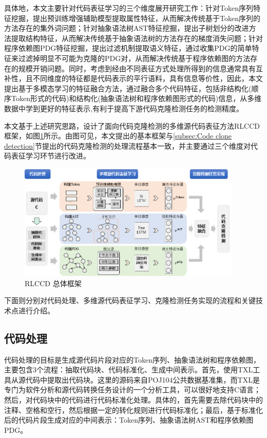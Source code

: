具体地，本文主要针对代码表征学习的三个维度展开研究工作：针对Token序列特征挖掘，提出预训练增强辅助模型提取属性特征，从而解决传统基于Token序列的方法存在的集外词问题；针对抽象语法树AST特征挖掘，提出子树划分的改进方法提取结构特征，从而解决传统基于抽象语法树的方法存在的梯度消失问题；针对程序依赖图PDG特征挖掘，提出过滤机制提取语义特征，通过收集PDG的简单特征来过滤掉明显不可能为克隆的PDG对，从而解决传统基于程序依赖图的方法存在的规模开销问题。同时，考虑到经由不同表征方式处理所得到的信息通常具有互补性，且不同维度的特征都是代码表示的平行语料，具有信息等价性，因此，本文提出基于多模态学习的特征融合方法，通过融合多个代码特征，包括非结构化(顺序Token形式的代码)和结构化(抽象语法树和程序依赖图形式的代码)信息，从多维数据中学到更好的特征表示,有利于提高下游代码克隆检测任务的检测精度。

本文基于上述研究思路，设计了面向代码克隆检测的多维源代码表征方法RLCCD框架，如图\ref{fig:framework}所示。由图可见，本文提出的基本框架与\ref{subsec:Code clone detection}节提出的代码克隆检测的处理流程基本一致，并主要通过三个维度对代码表征学习环节进行改进。

\begin{figure}
    \centering
    \includegraphics[width=0.95\textwidth]{figures/framework}
    \caption{RLCCD 总体框架}
    \label{fig:framework}
\end{figure}

下面则分别对代码处理、多维源代码表征学习、克隆检测任务实现的流程和关键技术点进行介绍。

\subsection{代码处理}
\label{subsec:Preprocess}
代码处理的目标是生成源代码片段对应的Token序列、抽象语法树和程序依赖图，主要包含3个流程：抽取代码块、代码标准化、生成中间表示。首先，使用TXL工具从源代码中提取出代码块。这里的源码来自POJ104公共数据基准集，而TXL是专门为软件分析和源代码转换任务设计的一个分析工具，可以很好地支持C语言；然后，对代码块中的代码进行代码标准化处理。具体的，首先需要去除代码块中的注释、空格和空行，然后根据一定的转化规则进行代码标准化；最后，基于标准化后的代码片段生成对应的中间表示：Token序列、抽象语法树AST和程序依赖图PDG。

